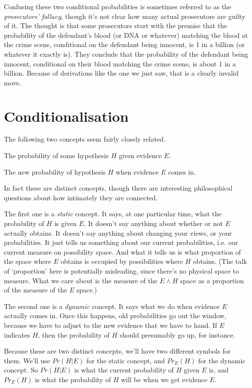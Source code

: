 Confusing these two conditional probabilities is sometimes referred to as the \textit{prosecutors' fallacy}, though it's not clear how many actual prosecutors are guilty of it. The thought is that some prosecutors start with the premise that the probability of the defendant's blood (or DNA or whatever) matching the blood at the crime scene, conditional on the defendant being innocent, is 1 in a billion (or whatever it exactly is). They conclude that the probability of the defendant being innocent, conditional on their blood matching the crime scene, is about 1 in a billion. Because of derivations like the one we just saw, that is a clearly invalid move.

\section{Conditionalisation}
The following two concepts seem fairly closely related.
\begin{itemize*}
\item The probability of some hypothesis $H$ given evidence $E$.
\item The new probability of hypothesis $H$ when evidence $E$ comes in.
\end{itemize*}
\noindent In fact these are distinct concepts, though there are interesting philosophical questions about how intimately they are connected.

The first one is a \textit{static} concept. It says, at one particular time, what the probability of $H$ is given $E$. It doesn't say anything about whether or not $E$ actually obtains. It doesn't say anything about changing your views, or your probabilities. It just tells us something about our current probabilities, i.e. our current measure on possibility space. And what it tells us is what proportion of the space where $E$ obtains is occupied by possibilities where $H$ obtains. (The talk of `proportion' here is potentially misleading, since there's no physical space to measure. What we care about is the measure of the $E \wedge H$ space as a proportion of the measure of the $E$ space.)

The second one is a \textit{dynamic} concept. It says what we do when evidence $E$ actually comes in. Once this happens, old probabilities go out the window, because we have to adjust to the new evidence that we have to hand. If $E$ indicates $H$, then the probability of $H$ should presumably go up, for instance.

Because these are two distinct concepts, we'll have two different symbols for them. We'll use $Pr(H | E)$ for the static concept, and $Pr_{E}(H)$ for the dynamic concept. So $Pr(H | E)$ is what the current probability of $H$ given $E$ is, and $Pr_{E}(H)$  is what the probability of $H$ will be when we get evidence $E$.

